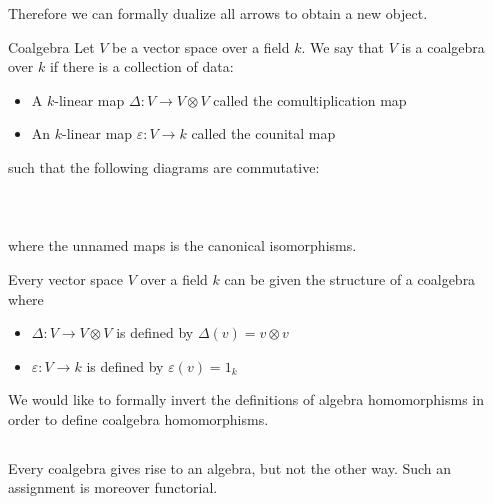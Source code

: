 \documentclass[a4paper]{article}
\begin{document}
Therefore we can formally dualize all arrows to obtain a new object. 

\begin{defn}{Coalgebra}{} Let $V$ be a vector space over a field $k$. We say that $V$ is a coalgebra over $k$ if there is a collection of data: 
\begin{itemize}
\item A $k$-linear map $\Delta:V\to V\otimes V$ called the comultiplication map
\item An $k$-linear map $\varepsilon:V\to k$ called the counital map
\end{itemize} 
such that the following diagrams are commutative: \\~\\
\\~\\
where the unnamed maps is the canonical isomorphisms. 
\end{defn}

\begin{lmm}{}{} Every vector space $V$ over a field $k$ can be given the structure of a coalgebra where 
\begin{itemize}
\item $\Delta:V\to V\otimes V$ is defined by $\Delta(v)=v\otimes v$
\item $\varepsilon:V\to k$ is defined by $\varepsilon(v)=1_k$
\end{itemize}

\end{lmm}

We would like to formally invert the definitions of algebra homomorphisms in order to define coalgebra homomorphisms. 

\subsection{}
Every coalgebra gives rise to an algebra, but not the other way. Such an assignment is moreover functorial. 
\end{document}
